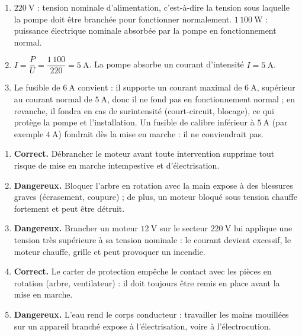 \documentclass[11pt]{article}
\begin{document}
\begin{corrige}
\begin{enumerate}
\item $220~\text{V}$ : tension nominale d'alimentation, c'est-à-dire la tension sous laquelle la pompe doit être branchée pour fonctionner normalement. $1\,100~\text{W}$ : puissance électrique nominale absorbée par la pompe en fonctionnement normal.
\item $I = \dfrac{P}{U} = \dfrac{1\,100}{220} = 5~\text{A}$. La pompe absorbe un courant d'intensité $\boxed{I = 5~\text{A}}$.
\item Le fusible de $6~\text{A}$ convient : il supporte un courant maximal de $6~\text{A}$, supérieur au courant normal de $5~\text{A}$, donc il ne fond pas en fonctionnement normal ; en revanche, il fondra en cas de surintensité (court-circuit, blocage), ce qui protège la pompe et l'installation. Un fusible de calibre inférieur à $5~\text{A}$ (par exemple $4~\text{A}$) fondrait dès la mise en marche : il ne conviendrait pas.
\end{enumerate}
\end{corrige}

\begin{corrige}
\begin{enumerate}
\item \textbf{Correct.} Débrancher le moteur avant toute intervention supprime tout risque de mise en marche intempestive et d'électrisation.
\item \textbf{Dangereux.} Bloquer l'arbre en rotation avec la main expose à des blessures graves (écrasement, coupure) ; de plus, un moteur bloqué sous tension chauffe fortement et peut être détruit.
\item \textbf{Dangereux.} Brancher un moteur $12~\text{V}$ sur le secteur $220~\text{V}$ lui applique une tension très supérieure à sa tension nominale : le courant devient excessif, le moteur chauffe, grille et peut provoquer un incendie.
\item \textbf{Correct.} Le carter de protection empêche le contact avec les pièces en rotation (arbre, ventilateur) : il doit toujours être remis en place avant la mise en marche.
\item \textbf{Dangereux.} L'eau rend le corps conducteur : travailler les mains mouillées sur un appareil branché expose à l'électrisation, voire à l'électrocution.
\end{enumerate}
\end{corrige}
\end{document}
